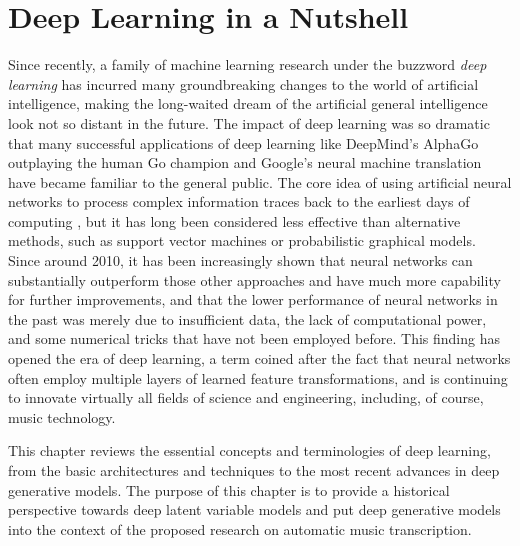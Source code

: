 
\graphicspath{{2-deeplearning/figures/}}

\chapter{Deep Learning in a Nutshell}\label{sec:deeplearning}
\label{ch:deeplearning}

Since recently, a family of machine learning research under the buzzword \emph{deep learning} has incurred many groundbreaking changes to the world of artificial intelligence, making the long-waited dream of the artificial general intelligence look not so distant in the future.
The impact of deep learning was so dramatic that many successful applications of deep learning like DeepMind's AlphaGo outplaying the human Go champion and Google's neural machine translation have became familiar to the general public.
The core idea of using artificial neural networks to process complex information traces back to the earliest days of computing \cite{kleene1951representation}, but it has long been considered less effective than alternative methods, such as support vector machines or probabilistic graphical models.
Since around 2010, it has been increasingly shown that neural networks can substantially outperform those other approaches and have much more capability for further improvements, and that the lower performance of neural networks in the past was merely due to insufficient data, the lack of computational power, and some numerical tricks that have not been employed before.
This finding has opened the era of deep learning, a term coined after the fact that neural networks often employ multiple layers of learned feature transformations, and is continuing to innovate virtually all fields of science and engineering, including, of course, music technology.

This chapter reviews the essential concepts and terminologies of deep learning, from the basic architectures and techniques to the most recent advances in deep generative models.
The purpose of this chapter is to provide a historical perspective towards deep latent variable models and put deep generative models into the context of the proposed research on automatic music transcription.


